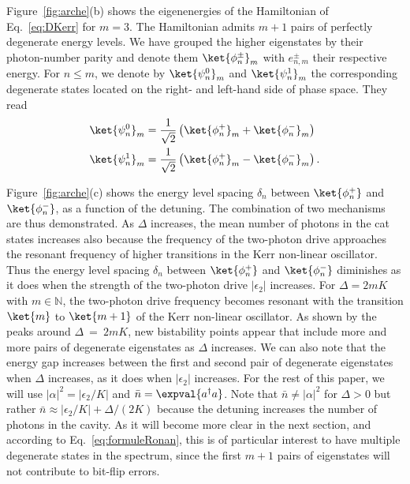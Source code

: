 Figure~\ref{fig:arche}(b) shows the eigenenergies of the Hamiltonian of Eq.~\eqref{eq:DKerr} for $m=3$. The Hamiltonian admits $m +1$  pairs of perfectly degenerate energy levels. We have grouped the higher eigenstates by their photon-number parity and denote them $\ket{\phi_n^\pm}_m$ with $e^\pm_{n,m}$ their respective energy. For $n \le m$, we denote by $\ket{\psi^0_n}_m$ and $\ket{\psi^1_n}_m$ the corresponding degenerate states located on the right- and left-hand side of phase space. They read
\begin{equation}
    \begin{split}
        &\ket{\psi^0_n}_m =\frac{1}{\sqrt{2}}\left(\ket{{\phi}_n^+}_m+\ket{{\phi}_n^-}_m\right) \\
        &\ket{\psi^1_n}_m =\frac{1}{\sqrt{2}}\left(\ket{{\phi}_n^+}_m-\ket{{\phi}_n^-}_m\right).
    \end{split}
\end{equation} 

Figure~\ref{fig:arche}(c) shows the energy level spacing $\delta_n$ between $\ket{{\phi}_n^+}$ and $\ket{{\phi}_n^-}$, as a function of the detuning. The combination of two mechanisms are thus demonstrated. As $\Delta$ increases, the mean number of photons in the cat states increases also because the frequency of the two-photon drive approaches the resonant frequency of higher transitions in the Kerr non-linear oscillator. Thus the energy level spacing $\delta_n$ between $\ket{{\phi}_n^+}$ and $\ket{{\phi}_n^-}$ diminishes as it does when the strength of the two-photon drive $|\epsilon_2|$ increases. For $\Delta = 2mK$ with $m \in \mathbb{N}$, the two-photon drive frequency becomes resonant with the transition $\ket{m}$ to $\ket{m+1}$ of the Kerr non-linear oscillator. As shown by the peaks around $\Delta~=~2mK$, new bistability points appear that include more and more pairs of degenerate eigenstates as $\Delta$ increases. We can also note that the energy gap increases between the first and second pair of degenerate eigenstates when $\Delta$ increases, as it does when $|\epsilon_2|$ increases. For the rest of this paper, we will use $|\alpha|^2 = |\epsilon_2/K|$ and $\bar{n} = \expval{a^\dagger a}$. Note that $\bar{n} \ne |\alpha|^2$ for $\Delta >0$ but rather $\bar{n} \approx |\epsilon_2/K|+\Delta/(2K)$ because the detuning increases the number of photons in the cavity. As it will become more clear in the next section, and according to Eq.~\eqref{eq:formuleRonan}, this is of particular interest to have multiple degenerate states in the spectrum, since the first $m +1$ pairs of eigenstates will not contribute to bit-flip errors.

